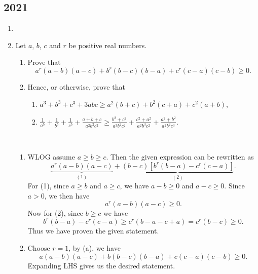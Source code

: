 \subsection*{2021}
\begin{enumerate}
\item 

\item Let $a$, $b$, $c$ and $r$ be positive real numbers.
\begin{enumerate}[label=(\alph*)]
\item Prove that
\[ a^r(a-b)(a-c)+b^r(b-c)(b-a)+c^r(c-a)(c-b)\ge0. \]
\item Hence, or otherwise, prove that
\begin{enumerate}[label=(\roman*)]
    \item $a^3+b^3+c^3+3abc\ge a^2(b+c)+b^2(c+a)+c^2(a+b)$,
    \item $\displaystyle\frac{1}{a^5}+\frac{1}{b^5}+\frac{1}{c^5}+\frac{a+b+c}{a^2b^2c^2}\ge\frac{b^2+c^2}{a^3b^2c^2}+\frac{c^2+a^2}{a^2b^3c^2}+\frac{a^2+b^2}{a^2b^2c^3}$.
\end{enumerate}
\end{enumerate}

\begin{solution} \
\begin{enumerate}[label=(\alph*)]
\item WLOG assume $a\ge b\ge c$. Then the given expression can be rewritten as
\[ \underbrace{a^r(a-b)(a-c)}_{(1)}+\underbrace{(b-c)[b^r(b-a)-c^r(c-a)]}_{(2)}. \]
For (1), since $a\ge b$ and $a\ge c$, we have $a-b\ge0$ and $a-c\ge0$. Since $a>0$, we then have
\[ a^r(a-b)(a-c)\ge0. \]
Now for (2), since $b\ge c$ we have
\[ b^r(b-a)-c^r(c-a)\ge c^r(b-a-c+a)=c^r(b-c)\ge0. \]
Thus we have proven the given statement.

\item Choose $r=1$, by (a), we have
\[ a(a-b)(a-c)+b(b-c)(b-a)+c(c-a)(c-b)\ge0. \]
Expanding LHS gives us the desired statement.


\end{enumerate}
\end{solution}
\end{enumerate}
